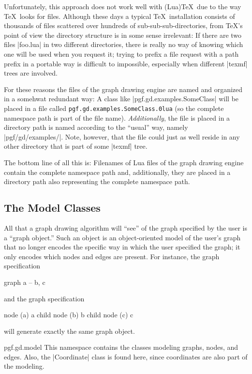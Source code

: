 Unfortunately, this approach does not work well with (Lua)\TeX\ due to
the way \TeX\ looks for files. Although these days a typical \TeX\
installation consists of thousands of files scattered over hundreds of
sub-sub-sub-directories, from \TeX's point of view the directory
structure is in some sense irrelevant: If there are two files
|foo.lua| in two different directories, there is really no way of
knowing which one will be used when you request it; trying to prefix a
file request with a path prefix in a portable way is difficult to
impossible, especially when different |texmf| trees are involved.

For these reasons the files of the graph drawing engine are named and
organized in a somehwat redundant way: A class like
|pgf.gd.examples.SomeClass| will be placed in a file called
\texttt{pgf.gd.examples.SomeClass.\penalty0lua} (so the complete namespace path is
part of the file name). \emph{Additionally}, the file is placed in a
directory path is named according to the ``usual'' way, namely
|pgf/gd/examples/|. Note, however, that the file could just as well
reside in any other directory that is part of some |texmf| tree.

The bottom line of all this is: Filenames of Lua files of the graph
drawing engine contain the complete namespace path and, additionally,
they are placed in a directory path also representing the complete
namespace path. 


\subsection{The Model Classes}

\label{section-gd-models}

All that a graph drawing algorithm will ``see'' of the graph specified
by the user is a ``graph object.'' Such an object is an
object-oriented model of the user's graph that no longer encodes the
specific way in which the user specified the graph; it only encodes
which nodes and edges are present. For instance, the graph
specification 
\begin{codeexample}
graph { a -- {b, c} }
\end{codeexample}
\noindent and the graph specification
\begin{codeexample}
node (a) { a }
child { node (b) {b} }
child { node (c) {c} }
\end{codeexample}
will generate exactly the same graph object.

\begin{luanamespace}{pgf.gd.}{model}
  This namespace contains the classes modeling graphs,
  nodes, and edges. Also, the |Coordinate| class is found here, since
  coordinates are also part of the modeling.  
\end{luanamespace}

